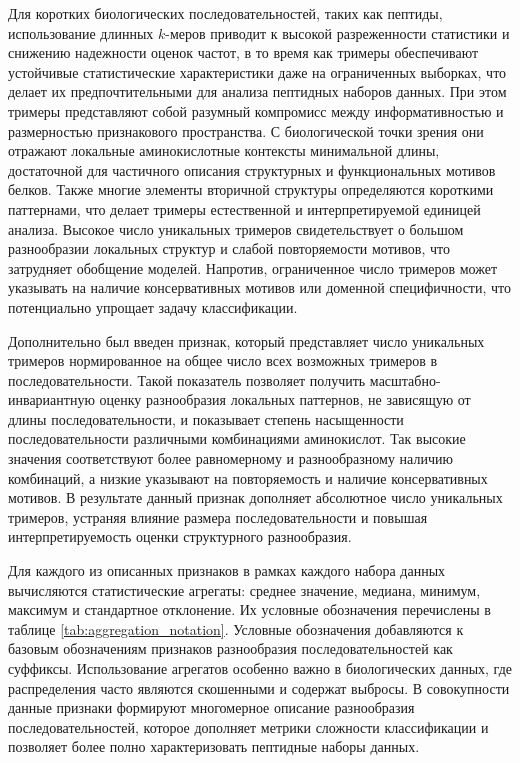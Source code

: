 \documentclass[specification,annotation,times]{itmo-student-thesis}
\begin{document}
Для коротких биологических последовательностей, таких как пептиды, использование длинных $k$-меров приводит к высокой разреженности статистики и снижению надежности оценок частот, в то время как тримеры обеспечивают устойчивые статистические характеристики даже на ограниченных выборках, что делает их предпочтительными для анализа пептидных наборов данных. При этом тримеры представляют собой разумный компромисс между информативностью и размерностью признакового пространства. С биологической точки зрения они отражают локальные аминокислотные контексты минимальной длины, достаточной для частичного описания структурных и функциональных мотивов белков. Также многие элементы вторичной структуры определяются короткими паттернами, что делает тримеры естественной и интерпретируемой единицей анализа.
Высокое число уникальных тримеров свидетельствует о большом разнообразии локальных структур и слабой повторяемости мотивов, что затрудняет обобщение моделей. Напротив, ограниченное число тримеров может указывать на наличие консервативных мотивов или доменной специфичности, что потенциально упрощает задачу классификации.

Дополнительно был введен признак, который представляет число уникальных тримеров нормированное на общее число всех возможных тримеров в последовательности. Такой показатель позволяет получить масштабно-инвариантную оценку разнообразия локальных паттернов, не зависящую от длины последовательности, и показывает степень насыщенности последовательности различными комбинациями аминокислот. Так высокие значения соответствуют более равномерному и разнообразному наличию комбинаций, а низкие указывают на повторяемость и наличие консервативных мотивов. В результате данный признак дополняет абсолютное число уникальных тримеров, устраняя влияние размера последовательности и повышая интерпретируемость оценки структурного разнообразия. 

Для каждого из описанных признаков в рамках каждого набора данных вычисляются статистические агрегаты: среднее значение, медиана, минимум, максимум и стандартное отклонение. 
Их условные обозначения перечислены в таблице \ref{tab:aggregation_notation}. 
Условные обозначения добавляются к базовым обозначениям признаков разнообразия последовательностей как суффиксы.
Использование агрегатов особенно важно в биологических данных, где распределения часто являются скошенными и содержат выбросы. 
В совокупности данные признаки формируют многомерное описание разнообразия последовательностей, которое дополняет метрики сложности классификации и позволяет более полно характеризовать пептидные наборы данных.
\end{document}
